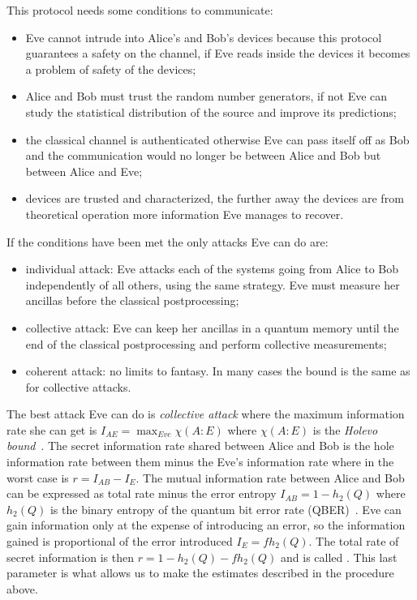 This protocol needs some conditions to communicate:
\begin{itemize}
  \item Eve cannot intrude into Alice’s and Bob’s devices because this protocol guarantees a safety on the channel, if Eve reads inside the devices it becomes a problem of safety of the devices;
  \item Alice and Bob must trust the random number generators, if not Eve can study the statistical distribution of the source and improve its predictions;
  \item the classical channel is authenticated otherwise Eve can pass itself off as Bob and the communication would no longer be between Alice and Bob but between Alice and Eve;
  \item devices are trusted and characterized, the further away the devices are from theoretical operation more information Eve manages to recover.
\end{itemize}

If the conditions have been met the only attacks Eve can do are:
\begin{itemize}
  \item individual attack: Eve attacks each of the systems going from Alice to Bob independently of all others, using the same strategy. Eve must measure her ancillas before the classical postprocessing;
  \item collective attack: Eve can keep her ancillas in a quantum memory until the end of the classical postprocessing and perform collective measurements;
  \item coherent attack: no limits to fantasy. In many cases the bound is the same as for collective attacks.
\end{itemize}

The best attack Eve can do is \textit{collective attack} where the maximum information rate she can get is  $I_{AE} = \max_{Eve} \chi(A:E)$ where $\chi(A:E)$ is the \textit{Holevo bound}~\cite{a24}. The secret information rate shared between Alice and Bob is the hole information rate between them minus the Eve's information rate where in the worst case is $r = I_{AB} - I_{E}$. The mutual information rate between Alice and Bob can be expressed as total rate minus the error entropy $I_{AB} = 1 - h_2(Q)$ where $h_2(Q)$ is the binary entropy of the quantum bit error rate (QBER)~\cite{a24}. Eve can gain information only at the expense of introducing an error, so the information gained is proportional of the error introduced $I_E = f h_2(Q)$. The total rate of secret information is then $r = 1 - h_2(Q) - f h_2(Q)$ and is called . This last parameter is what allows us to make the estimates described in the procedure above.


